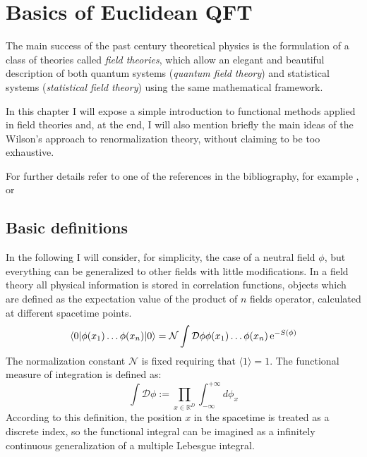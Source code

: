 

\chapter{Basics of Euclidean QFT}
\noindent

The main success of the past century theoretical physics is the formulation of a class of theories called \emph{field theories},
which allow an elegant and beautiful description of both quantum systems (\emph{quantum field theory}) and statistical systems 
(\emph{statistical field theory}) using the same mathematical framework.

In this chapter I will expose a simple introduction to functional methods applied in field theories and, at the end, I will also mention briefly the main ideas of the Wilson's approach to renormalization theory,
without claiming to be too exhaustive.

For further details refer to one of the references in the bibliography, for example \cite{weinbergQFT}, \cite{Soldati3} or \cite{PS}

\section{Basic definitions}
In the following I will consider, for simplicity, the case of a neutral field $\phi$, but everything can be generalized to other fields with little modifications.
In a field theory all physical information is stored in correlation functions, objects which are defined as the expectation value of the product of $n$ fields operator, 
calculated at different spacetime points.
\begin{equation}
\langle 0 | \phi(x_1) \dots \phi(x_n)| 0  \rangle  =\mathcal{N}\int \mathcal{D} \phi\phi(x_1) \dots \phi(x_n) \operatorname{e}^{-S(\phi)}
\end{equation}
The normalization constant $\mathcal{N}$ is fixed requiring that $\langle1\rangle = 1$. 
The functional measure of integration is defined as:
\begin{equation}
\int \mathcal{D} \phi := \prod_{x \in \mathbb{R}^D}\int_{-\infty}^{+\infty} d \phi_x
\end{equation}
According to this definition, the position $x$ in the spacetime is treated as a discrete index, 
so the  functional integral can be imagined as a infinitely continuous generalization of a multiple Lebesgue integral.

